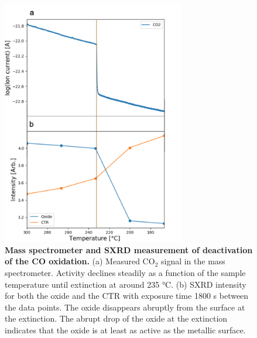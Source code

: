 \documentclass[aps,prl,groupedaddress,twocolumn]{revtex4-1}
\begin{document}


\begin{figure}
	\includegraphics[width=8cm]{edited_1_fig.png}
	\caption{\textbf{Mass spectrometer and SXRD measurement of deactivation of the CO oxidation.} (a) Measured CO$_2$ signal in the mass spectrometer. Activity declines steadily as a function of the sample temperature until extinction at around 235 $\si{\degreeCelsius}$. (b) SXRD intensity for both the oxide and the CTR with exposure time 1800 s between the data points. The oxide disappears abruptly from the surface at the extinction. The abrupt drop of the oxide at the extinction indicates that the oxide is at least as active as the metallic surface.}\label{Fig:1}
\end{figure}
\end{document}
